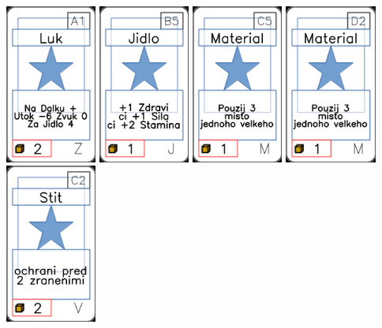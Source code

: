 \documentclass[a4paper]{article}
\begin{document}
	\includegraphics[width=3.0cm]{img-1_90}
	\includegraphics[width=3.0cm]{img-1_9}
	\includegraphics[width=3.0cm]{img-1_44}
	\includegraphics[width=3.0cm]{img-1_46}
	\includegraphics[width=3.0cm]{img-1_71}
\end{document}
